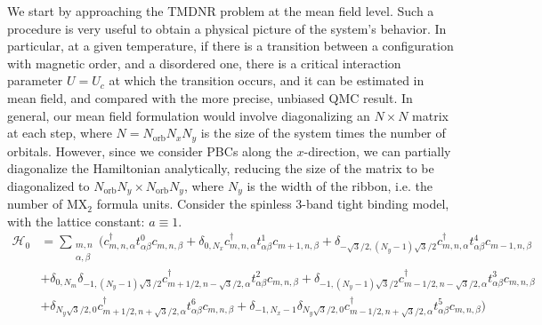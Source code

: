 We start by approaching the \acs{TMDNR} problem at the mean field level.
Such a procedure is very useful to obtain a physical picture of the system's behavior.
In particular, at a given temperature, if there is a transition between a configuration with magnetic order, and a disordered one, there is a critical interaction parameter $U = U_c$ at which the transition occurs, and it can be estimated in mean field, and compared with the more precise, unbiased \acs{QMC} result.
In general, our mean field formulation would involve diagonalizing an $N \times N$ matrix at each step, where $N = N_{\text{orb}} N_x N_y$ is the size of the system times the number of orbitals.
However, since we consider \acs{PBC}s along the $x$-direction, we can partially diagonalize  the Hamiltonian analytically, reducing the size of the matrix to be diagonalized to $N_{\text{orb}} N_y \times N_{\text{orb}} N_y$, where $N_y$ is the width of the ribbon, i.e. the number of $\text{M}\text{X}_2$ formula units.
Consider the spinless 3-band tight binding model, with the lattice constant: $a \equiv 1$.
\begin{equation}
\begin{split}
\mathcal{H}_0 &= \sum_{\substack{m, n \\ \alpha, \beta}} \bigg( c_{m,n, \alpha}^\dagger t_{\alpha\beta}^0 c_{m, n, \beta} + \delta_{0, N_x}  c_{m,n, \alpha}^\dagger t_{\alpha\beta}^1 c_{m+1, n, \beta} + \delta_{-\sqrt{3}/2, (N_y -1)\sqrt{3}/2}  c_{m,n, \alpha}^\dagger t_{\alpha\beta}^4 c_{m-1, n, \beta} \\
& + \delta_{0, N_m} \delta_{-1, (N_y -1)\sqrt{3}/2} c_{m+1/2,n-\sqrt{3}/2, \alpha}^\dagger t_{\alpha\beta}^2 c_{m, n, \beta} + \delta_{-1, (N_y -1)\sqrt{3}/2} c_{m-1/2,n-\sqrt{3}/2, \alpha}^\dagger t_{\alpha\beta}^3 c_{m, n, \beta} \\
& + \delta_{N_y\sqrt{3}/2, 0} c_{m+1/2,n+\sqrt{3}/2, \alpha}^\dagger t_{\alpha\beta}^6 c_{m, n, \beta} + \delta_{-1, N_x -1} \delta_{N_y\sqrt{3}/2, 0} c_{m-1/2,n+\sqrt{3}/2, \alpha}^\dagger t_{\alpha\beta}^5 c_{m, n, \beta} \bigg)
\end{split}
\end{equation}

